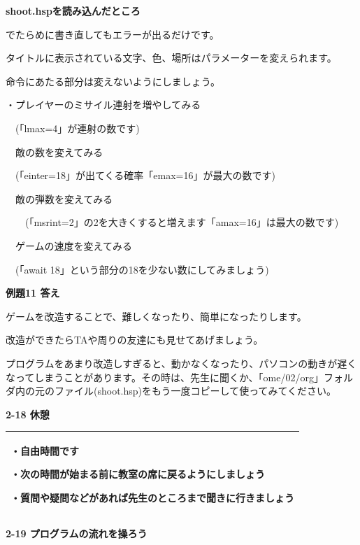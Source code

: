 \documentclass[a4paper,dvipdfmx]{jarticle}
\newcommand\textstyleqwerty[1]{#1}
\begin{document}
\bigskip


\bigskip


\bigskip

\textstyleqwerty{\textbf{shoot.hspを読み込んだところ}}


\bigskip


\bigskip


\bigskip


\bigskip

でたらめに書き直してもエラーが出るだけです。

タイトルに表示されている文字、色、場所はパラメーターを変えられます。

命令にあたる部分は変えないようにしましょう。


\bigskip

・プレイヤーのミサイル連射を増やしてみる


\bigskip

\ \ (「lmax=4」が連射の数です)

\ \ 敵の数を変えてみる

\ \ (「einter=18」が出てくる確率「emax=16」が最大の数です)

\ \ 敵の弾数を変えてみる

\ \ \ \ (「msrint=2」の2を大きくすると増えます「amax=16」は最大の数です)

\ \ ゲームの速度を変えてみる

\ \ (「await
18」という部分の18を少ない数にしてみましょう)


\bigskip


\bigskip

{\bfseries
例題11 答え}


\bigskip

\textstyleqwerty{ゲームを改造することで、難しくなったり、簡単になったりします。}

改造ができたらTAや周りの友達にも見せてあげましょう。


\bigskip

プログラムをあまり改造しすぎると、動かなくなったり、パソコンの動きが遅くなってしまうことがあります。その時は、先生に聞くか、「ome/02/org」フォルダ内の元のファイル(shoot.hsp)をもう一度コピーして使ってみてください。


\bigskip


\bigskip


\bigskip

{\bfseries
2-18 休憩}


\bigskip

\begin{flushleft}
\tablefirsthead{}
\tablehead{}
\tabletail{}
\tablelasttail{}
\begin{supertabular}{|m{10.542cm}|}
\hline
・自由時間です

・次の時間が始まる前に教室の席に戻るようにしましょう

・質問や疑問などがあれば先生のところまで聞きに行きましょう\\\hline
\end{supertabular}
\end{flushleft}
\textstyleqwerty{\textbf{2-19 プログラムの流れを操ろう}}
\end{document}
